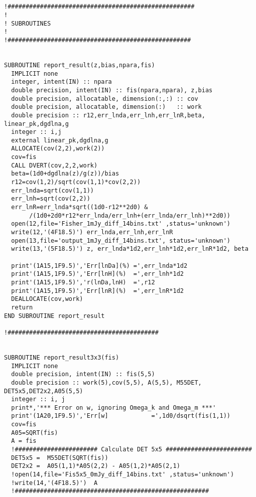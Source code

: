 \documentclass[11pt]{amsart}
\begin{document}
 \begin{verbatim}
 

!####################################################
!
! SUBROUTINES
! 
!###################################################


SUBROUTINE report_result(z,bias,npara,fis)
  IMPLICIT none
  integer, intent(IN) :: npara
  double precision, intent(IN) :: fis(npara,npara), z,bias
  double precision, allocatable, dimension(:,:) :: cov
  double precision, allocatable, dimension(:)   :: work
  double precision :: r12,err_lnda,err_lnh,err_lnR,beta, linear_pk,dgdlna,g
  integer :: i,j
  external linear_pk,dgdlna,g
  ALLOCATE(cov(2,2),work(2))
  cov=fis
  CALL DVERT(cov,2,2,work)
  beta=(1d0+dgdlna(z)/g(z))/bias
  r12=cov(1,2)/sqrt(cov(1,1)*cov(2,2))
  err_lnda=sqrt(cov(1,1))
  err_lnh=sqrt(cov(2,2))
  err_lnR=err_lnda*sqrt((1d0-r12**2d0) &
       /(1d0+2d0*r12*err_lnda/err_lnh+(err_lnda/err_lnh)**2d0))
  open(12,file='Fisher_1mJy_diff_14bins.txt' ,status='unknown')
  write(12,'(4F18.5)') err_lnda,err_lnh,err_lnR
  open(13,file='output_1mJy_diff_14bins.txt', status='unknown')
  write(13,'(5F18.5)') z, err_lnda*1d2,err_lnh*1d2,err_lnR*1d2, beta      
       
  print'(1A15,1F9.5)','Err[lnDa](%) =',err_lnda*1d2
  print'(1A15,1F9.5)','Err[lnH](%)  =',err_lnh*1d2
  print'(1A15,1F9.5)','r(lnDa,lnH)  =',r12
  print'(1A15,1F9.5)','Err[lnR](%)  =',err_lnR*1d2
  DEALLOCATE(cov,work)
  return
END SUBROUTINE report_result

!##########################################


SUBROUTINE report_result3x3(fis)
  IMPLICIT none
  double precision, intent(IN) :: fis(5,5)
  double precision :: work(5),cov(5,5), A(5,5), M55DET, DET5x5,DET2x2,A05(5,5)
  integer :: i, j 
  print*,'*** Error on w, ignoring Omega_k and Omega_m ***'
  print'(1A20,1F9.5)','Err[w]            =',1d0/dsqrt(fis(1,1))
  cov=fis
  A05=SQRT(fis)
  A = fis
  !####################### Calculate DET 5x5 ########################
  DET5x5 =  M55DET(SQRT(fis))
  DET2x2 =  A05(1,1)*A05(2,2) - A05(1,2)*A05(2,1)
  !open(14,file='Fis5x5_0mJy_diff_14bins.txt' ,status='unknown')
  !write(14,'(4F18.5)')  A
  !######################################################
  

\end{verbatim}
\end{document}

